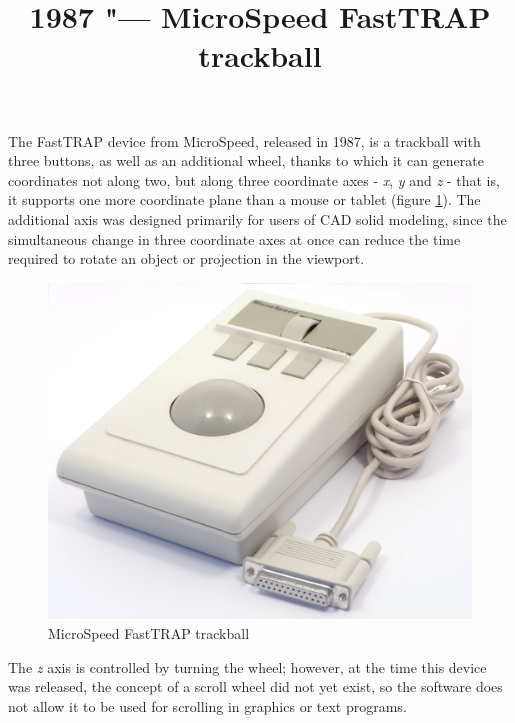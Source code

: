 \documentclass[11pt, a4paper]{article}
\begin{document}
\title{1987 "--- MicroSpeed FastTRAP trackball}
\date{}
\maketitle

The FastTRAP device from MicroSpeed, released in 1987, is a trackball with three buttons, as well as an additional wheel, thanks to which it can generate coordinates not along two, but along three coordinate axes - \textit{x}, \textit{y} and \textit{z} - that is, it supports one more coordinate plane than a mouse or tablet (figure \ref{fig:FastTRAPPic}). The additional axis was designed primarily for users of CAD solid modeling, since the simultaneous change in three coordinate axes at once can reduce the time required to rotate an object or projection in the viewport.

\begin{figure}[h]
   \centering
    \includegraphics[scale=0.3]{1987_microspeed_fasttrap/pic_15.jpg}
    \caption{MicroSpeed FastTRAP trackball}
    \label{fig:FastTRAPPic}
\end{figure}

The \textit{z} axis is controlled by turning the wheel; however, at the time this device was released, the concept of a scroll wheel did not yet exist, so the software does not allow it to be used for scrolling in graphics or text programs.
\end{document}
